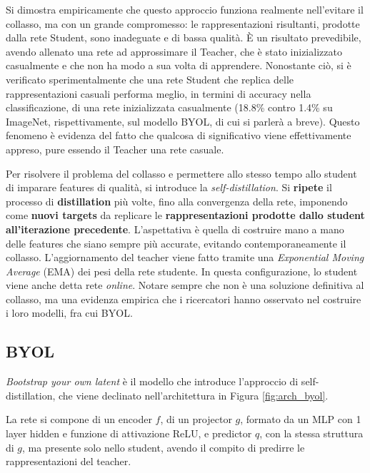 Si dimostra empiricamente che questo approccio funziona realmente nell'evitare il collasso, ma con un grande compromesso: le rappresentazioni risultanti, prodotte dalla rete Student, sono inadeguate e di bassa qualità. È un risultato prevedibile, avendo allenato una rete ad approssimare il Teacher, che è stato inizializzato casualmente e che non ha modo a sua volta di apprendere. Nonostante ciò, si è verificato sperimentalmente che una rete Student che replica delle rappresentazioni casuali performa meglio, in termini di accuracy nella classificazione, di una rete inizializzata casualmente (18.8\% contro 1.4\% su ImageNet, rispettivamente, sul modello BYOL, di cui si parlerà a breve). Questo fenomeno è evidenza del fatto che qualcosa di significativo viene effettivamente appreso, pure essendo il Teacher una rete casuale. 

Per risolvere il problema del collasso e permettere allo stesso tempo allo student di imparare features di qualità, si introduce la \textit{self-distillation}. Si \textbf{ripete} il processo di \textbf{distillation} più volte, fino alla convergenza della rete, imponendo come \textbf{nuovi targets} da replicare le \textbf{rappresentazioni prodotte dallo student all'iterazione precedente}. L'aspettativa è quella di costruire mano a mano delle features che siano sempre più accurate, evitando contemporaneamente il collasso. L'aggiornamento del teacher viene fatto tramite una \textit{Exponential Moving Average} (EMA) dei pesi della rete studente. In questa configurazione, lo student viene anche detta rete \textit{online}. Notare sempre che non è una soluzione definitiva al collasso, ma una evidenza empirica che i ricercatori hanno osservato nel costruire i loro modelli, fra cui BYOL.

\subsection{BYOL}
\textit{Bootstrap your own latent} \cite{byol} è il modello che introduce l'approccio di self-distillation, che viene declinato nell'architettura in Figura \ref{fig:arch_byol}.

La rete si compone di un encoder \(f\), di un projector \(g\), formato da un MLP con 1 layer hidden e funzione di attivazione ReLU, e predictor \(q\), con la stessa struttura di \(g\), ma presente solo nello student, avendo il compito di predirre le rappresentazioni del teacher.

